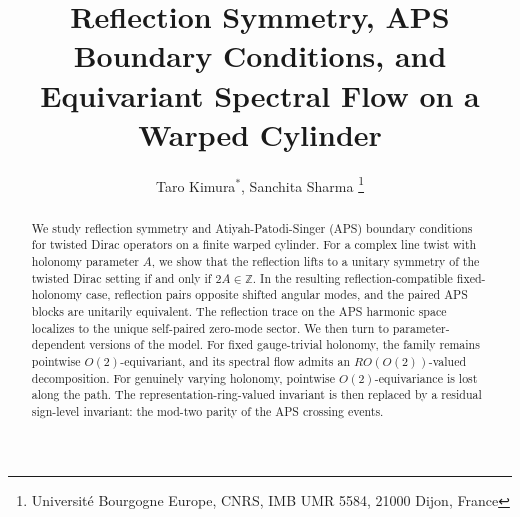 \documentclass[11pt]{article}
\title{Reflection Symmetry, APS Boundary Conditions, and Equivariant Spectral Flow on a Warped Cylinder}
\author{Taro Kimura$^*$, Sanchita Sharma%
\thanks{Université Bourgogne Europe, CNRS, IMB UMR 5584, 21000 Dijon, France}}
\date{}
\theoremstyle{definition}
\numberwithin{equation}{section}
\begin{document}
\maketitle


\begin{abstract}
We study reflection symmetry and Atiyah-Patodi-Singer (APS) boundary conditions for twisted Dirac operators on a finite warped cylinder. For a complex line twist with holonomy parameter $A$, we show that the reflection %
lifts to a unitary symmetry of the twisted Dirac setting if and only if $2A\in\mathbb Z$. In the resulting reflection-compatible fixed-holonomy case, reflection pairs opposite shifted angular modes, and the paired APS blocks are unitarily equivalent. %
The reflection trace on the APS harmonic space localizes to the unique self-paired zero-mode sector. We then turn to parameter-dependent versions of the model. For fixed gauge-trivial holonomy, the family remains pointwise \(O(2)\)-equivariant, and its spectral flow admits an \(RO(O(2))\)-valued decomposition. For genuinely varying holonomy, pointwise \(O(2)\)-equivariance is lost along the path. The representation-ring-valued invariant is then replaced by a residual sign-level invariant: the mod-two parity of the APS crossing events.













\end{abstract}
\end{document}
